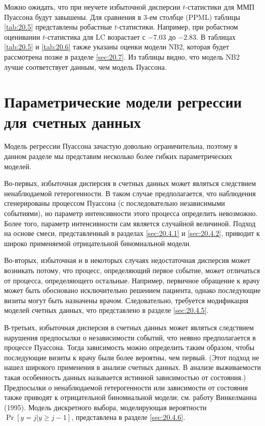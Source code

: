 Можно ожидать, что при неучете избыточной дисперсии $t$-статистики для ММП Пуассона будут завышены. Для сравнения в 3-ем столбце (PPML) таблицы \ref{tab:20.5} представлены робастные $t$-статистики. Например, при робастном оценивании $t$-статистика для LC возрастает с $-7.03$ до $-2.83$. В таблицах \ref{tab:20.5} и \ref{tab:20.6} также указаны оценки модели NB2, которая будет рассмотрена позже в разделе \ref{sec:20.7}. Из таблицы видно, что модель NB2 лучше соответствует данным, чем модель Пуассона.




\section{Параметрические модели регрессии для счетных данных}\label{sec:20.4}

\noindent
Модель регрессии Пуассона зачастую довольно ограничительна, поэтому в данном разделе мы представим несколько более гибких параметрических моделей.

Во-первых, избыточная дисперсия в счетных данных может являться следствием ненаблюдаемой гетерогенности. В таком случае предполагается, что наблюдения сгенерированы процессом Пуассона (с последовательно независимыми событиями), но параметр интенсивности этого процесса определить невозможно. Более того, параметр интенсивности сам является случайной величиной. Подход на основе смеси, представленный в разделах \ref{sec:20.4.1} и \ref{sec:20.4.2}, приводит к широко применяемой отрицательной биномиальной модели.

Во-вторых, избыточная и в некоторых случаях недостаточная дисперсия может возникать потому, что процесс, определяющий первое событие, может отличаться от процесса, определяющего остальные. Например, первичное обращение к врачу может быть обосновано исключительно решением пациента, однако последующие визиты могут быть назначены врачом. Следовательно, требуется модификация моделей счетных данных, что представлено в разделе \ref{sec:20.4.5}.

В-третьих, избыточная дисперсия в счетных данных может являться следствием нарушения предпосылки о независимости событий, что неявно предполагается в процессе Пуассона. Тогда зависимость можно определить таким образом, чтобы последующие визиты к врачу были более вероятны, чем первый. (Этот подход не нашел широкого применения в анализе счетных данных. В анализе выживаемости такая особенность данных называется истинной зависимостью от состояния.) Предпосылки о ненаблюдаемой гетерогенности или зависимости от состояния также приводят к отрицательной биномиальной модели; см. работу Винкелманна (1995). Модель дискретного выбора, моделирующая вероятности $\Pr[y = j|y\ge j - 1]$, представлена в разделе \ref{sec:20.4.6}.

